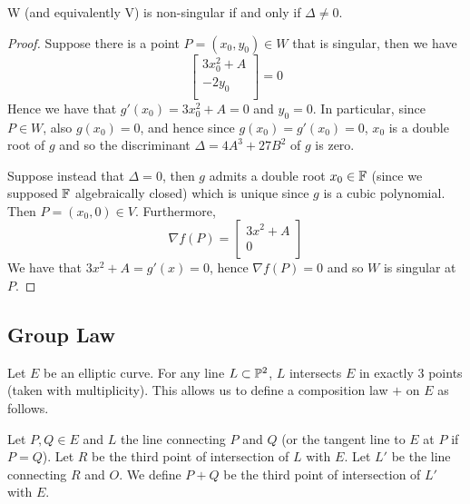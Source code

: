 \begin{proposition}
	\label{prop:singular-determinant}
	W (and equivalently V)
	is non-singular if and only if $\Delta \neq 0$.
\end{proposition}
\begin{proof}
	Suppose there is a point $P = (x_0, y_0) \in W$ that is singular,
	then we have
	\begin{equation*}
		\begin{bmatrix}
			3x_0^2 + A\\
			-2y_0\\
		\end{bmatrix} = 0
	\end{equation*}
	Hence we have that $g'(x_0) = 3x_0^2 + A = 0$ and $y_0 = 0$.
	In particular, since $P \in W$, also 
	$g(x_0) = 0$, and hence since $g(x_0) = g'(x_0) = 0$,
	$x_0$ is a double root of $g$ and so the discriminant
	$\Delta = 4A^3 + 27B^2$ of $g$ is zero.

	Suppose instead that $\Delta = 0$, then $g$ admits a double root
	$x_0 \in \mathbb{F}$ (since we supposed $\mathbb{F}$ algebraically closed)
	which is unique since $g$ is a cubic polynomial.
	Then $P = (x_0, 0) \in V$.
	Furthermore,
	\begin{equation*}
		\nabla f(P) =
		\begin{bmatrix}
			3x^2 + A\\
			0\\
		\end{bmatrix}
	\end{equation*}
	We have that $3x^2 + A = g'(x) = 0$, hence $\nabla f(P) = 0$
	and so $W$ is singular at $P$.
\end{proof}

\subsection{Group Law}

Let $E$ be an elliptic curve. For any line $L \subset \mathbb{P}^2$, $L$ intersects
$E$ in exactly 3 points (taken with multiplicity). This allows us
to define a composition law $+$ on $E$ as
follows.

\begin{definition}
	\label{def:group-law}
	Let $P, Q \in E$ and $L$ the line connecting $P$ and $Q$ (or the tangent line
	to $E$ at $P$ if $P = Q$). Let $R$ be the third point of intersection of $L$
	with $E$. Let $L'$ be the line connecting $R$ and $O$. We define $P + Q$
	be the third point of intersection of $L'$ with $E$.
\end{definition}

